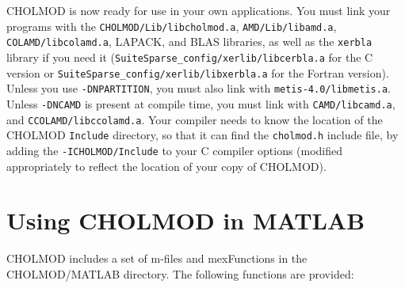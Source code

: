 \documentclass[11pt]{article}
\begin{document}
CHOLMOD is now ready for use in your own applications.  You must link
your programs with the
{\tt CHOLMOD/Lib/libcholmod.a},
{\tt AMD/Lib/libamd.a},
{\tt COLAMD/libcolamd.a},
LAPACK,
and
BLAS libraries,
as well as the {\tt xerbla} library if you need it
({\tt SuiteSparse\_config/xerlib/libcerbla.a} for the C version or
\newline
 {\tt SuiteSparse\_config/xerlib/libxerbla.a} for the Fortran version).
Unless you use {\tt -DNPARTITION}, you must also link with
{\tt metis-4.0/libmetis.a}.
Unless {\tt -DNCAMD} is present at compile time,
you must link with {\tt CAMD/libcamd.a}, and {\tt CCOLAMD/libccolamd.a}.
Your compiler needs to know the location of the CHOLMOD {\tt Include} directory,
so that it can find the {\tt cholmod.h} include file, by
adding the {\tt -ICHOLMOD/Include} to your C compiler options
(modified appropriately to reflect the location of your copy of CHOLMOD).

\newpage \section{Using CHOLMOD in MATLAB}

CHOLMOD includes a set of m-files and mexFunctions in the CHOLMOD/MATLAB
directory.  The following functions are provided:
\end{document}
